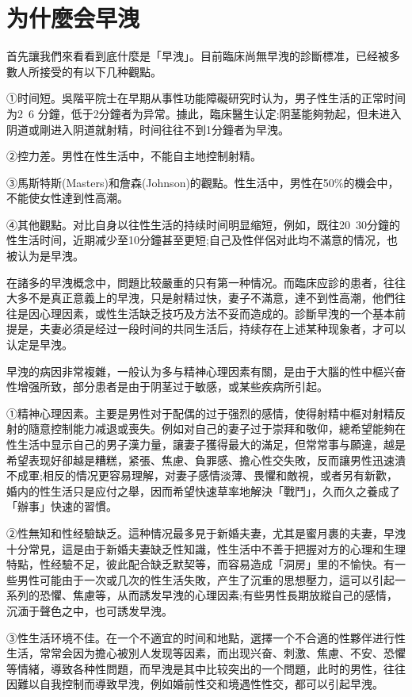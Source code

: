 \documentclass[12pt,UTF8]{ctexbook}
\begin{document}
\section{为什麼会早洩}

首先讓我們來看看到底什麼是「早洩」。目前臨床尚無早洩的診斷標准，已经被多數人所接受的有以下几种觀點。

①时间短。吳階平院士在早期从事性功能障礙研究时认为，男子性生活的正常时间为2~6 分鐘，低于2分鐘者为异常。據此，臨床醫生认定:阴茎能夠勃起，但未进入阴道或剛进入阴道就射精，时间往往不到1分鐘者为早洩。

②控力差。男性在性生活中，不能自主地控制射精。

③馬斯特斯(Masters)和詹森(Johnson)的觀點。性生活中，男性在50\%的機会中，不能使女性達到性高潮。

④其他觀點。对比自身以往性生活的持续时间明显缩短，例如，既往20~30分鐘的性生活时间，近期减少至10分鐘甚至更短;自己及性伴侶对此均不滿意的情况，也被认为是早洩。

在諸多的早洩概念中，問題比较嚴重的只有第一种情况。而臨床应診的患者，往往大多不是真正意義上的早洩，只是射精过快，妻子不滿意，達不到性高潮，他們往往是因心理因素，或性生活缺乏技巧及方法不妥而造成的。診斷早洩的一个基本前提是，夫妻必須是经过一段时间的共同生活后，持续存在上述某种现象者，才可以认定是早洩。

早洩的病因非常複雜，一般认为多与精神心理因素有關，是由于大腦的性中樞兴奋性增强所致，部分患者是由于阴茎过于敏感，或某些疾病所引起。

①精神心理因素。主要是男性对于配偶的过于强烈的感情，使得射精中樞对射精反射的隨意控制能力减退或喪失。例如对自己的妻子过于崇拜和敬仰，總希望能夠在性生活中显示自己的男子漢力量，讓妻子獲得最大的滿足，但常常事与願違，越是希望表现好卻越是糟糕，紧張、焦慮、負罪感、擔心性交失敗，反而讓男性迅速潰不成軍;相反的情况更容易理解，对妻子感情淡薄、畏懼和敵視，或者另有新歡，婚内的性生活只是应付之舉，因而希望快速草率地解決「戰鬥」，久而久之養成了「辦事」快速的習慣。

②性無知和性经驗缺乏。這种情况最多見于新婚夫妻，尤其是蜜月裹的夫妻，早洩十分常見，這是由于新婚夫妻缺乏性知識，性生活中不善于把握对方的心理和生理特點，性经驗不足，彼此配合缺乏默契等，而容易造成「洞房」里的不愉快。有一些男性可能由于一次或几次的性生活失敗，产生了沉重的思想壓力，這可以引起一系列的恐懼、焦慮等，从而誘发早洩的心理因素;有些男性長期放縱自己的感情，沉湎于聲色之中，也可誘发早洩。

③性生活环境不佳。在一个不適宜的时间和地點，選擇一个不合適的性夥伴进行性生活，常常会因为擔心被別人发现等因素，而出现兴奋、刺激、焦慮、不安、恐懼等情緒，導致各种性問題，而早洩是其中比较突出的一个問題，此时的男性，往往因難以自我控制而導致早洩，例如婚前性交和境遇性性交，都可以引起早洩。
\end{document}
